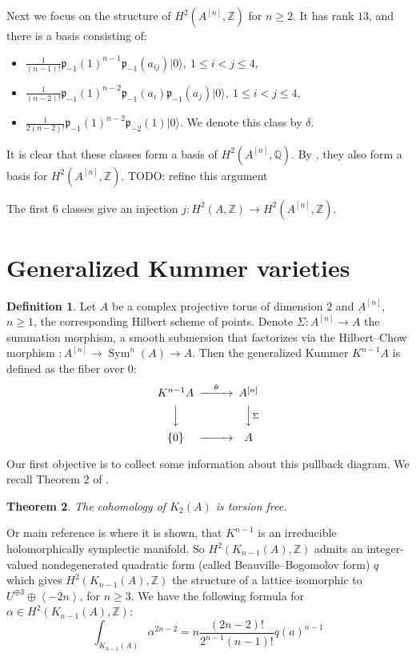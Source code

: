 \documentclass{amsart}
\DeclareMathOperator{\Sym}{Sym}
\newcommand{\hilb}[1]{^{[#1]}}
\newcommand{\vac}{|0\rangle}
\newcommand{\p}{\mathfrak{p}}
\newcommand{\kum}[2]{K_{ #2 }( #1 )}
\newcommand{\Q}{\mathbb{Q}}
\newcommand{\Z}{\mathbb{Z}}
\theoremstyle{plain}
\newtheorem{theorem}{Theorem}[section]
\theoremstyle{definition}
\newtheorem{definition}[theorem]{Definition}
\theoremstyle{remark}
\begin{document}
Next we focus on the structure of $H^2(A\hilb{n},\Z)$ for $n\geq 2$. It has rank $13$, and there is a basis consisting of:
\begin{itemize}
 \item $\frac{1}{(n-1)!}\p_{-1}(1)^{n-1}\p_{-1}(a_{ij})\vac,\ 1\leq i < j\leq 4$,
 \item $\frac{1}{(n-2)!}\p_{-1}(1)^{n-2}\p_{-1}(a_{i})\p_{-1}(a_{j})\vac,\ 1\leq i < j\leq 4$,
 \item $\frac{1}{2(n-2)!}\p_{-1}(1)^{n-2}\p_{-2}(1) \vac$. We denote this class by $\delta$.
\end{itemize}
It is clear that these classes form a basis of $H^2(A\hilb{n},\Q)$. By \cite[Thm.~4.6,Lemma~5.2]{QinWang}, they also form a basis for $H^2(A\hilb{n},\Z)$. TODO: refine this argument

The first $6$ classes give an injection $j : H^2(A,\Z)\rightarrow H^2(A\hilb{n},\Z)$. 

\section{Generalized Kummer varieties}
\begin{definition}
Let $A$ be a complex projective torus of dimension $2$ and $A\hilb{n}$, $n\geq 1$, the corresponding Hilbert scheme of points. Denote $\Sigma : A\hilb{n} \rightarrow A$ the summation morphism, a smooth submersion that factorizes via the Hilbert--Chow morphism $: A\hilb{n}\rightarrow\Sym^n(A)\rightarrow A$. Then the generalized Kummer $K^{n-1} A $ is defined as the fiber over $0$:
\begin{equation}\label{square}
\begin{CD}
K^{n-1}A @>\theta >> A\hilb{n}\\
@VVV @VV\Sigma V\\
\{0\} @> >> A
\end{CD}
\end{equation}
\end{definition}
Our first objective is to collect some information about this pullback diagram. 
We recall Theorem 2 of \cite{Spanier}.
\begin{theorem}\label{torsion}
The cohomology of $K_{2}(A)$ is torsion free. 
\end{theorem}
Or main reference is \cite{Beauville} where it is shown, that $K^{n-1}$ is an irreducible holomorphically symplectic manifold. So $H^2(\kum{A}{n-1},\Z)$ admits an integer-valued nondegenerated quadratic form (called Beauville--Bogomolov form) $q$ which gives $H^2(\kum{A}{n-1},\Z)$ the structure of a lattice isomorphic to $U^{\oplus 3}\oplus \left< -2n \right>$, for $n\geq 3$. We have the following formula for $\alpha\in H^2(\kum{A}{n-1},\Z)$:
\begin{equation} \label{fujiki}
\int_{\kum{A}{n-1}} \alpha^{2n-2} = n\frac{(2n-2)!}{2^{n-1}(n-1)!} q(a)^{n-1}
\end{equation}
\end{document}
